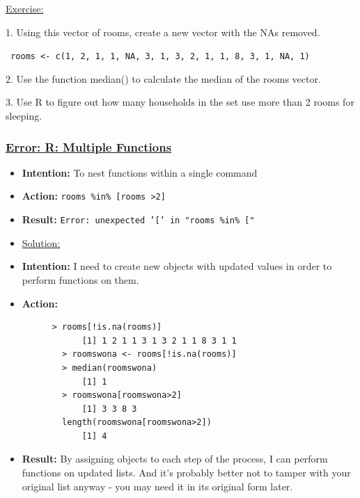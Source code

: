 \documentclass[12pt]{article}
\begin{document}
\vspace{0.5em}
\begin{addmargin}[1cm]{0cm}
\color{gray}
\underline{Exercise:}

1. Using this vector of rooms, create a new vector with the NAs removed.

\texttt{ rooms <- c(1, 2, 1, 1, NA, 3, 1, 3, 2, 1, 1, 8, 3, 1, NA, 1)}

2. Use the function median() to calculate the median of the rooms vector.

3. Use R to figure out how many households in the set use more than 2 rooms for sleeping.

\color{black}\vspace{0.5em}

{\subsubsection{\texorpdfstring{\underline{Error: R: Multiple Functions}}{}}\label{error:er19}
\begin{itemize}
  \vspace{-0.5em}\item \textbf{Intention:} To nest functions within a single command
  \vspace{-0.5em}\item \textbf{Action:} \texttt{rooms \%in\% [rooms >2]}
  \vspace{-0.5em}\item \textbf{Result:} \texttt{Error: unexpected '[' in "rooms \%in\% ["}
\end{itemize}
\begin{itemize}
\renewcommand{\labelitemi}{}
\item \underline{Solution:}
\renewcommand{\labelitemi}{$\bullet$}
  \item \textbf{Intention:} I need to create new objects with updated values in order to perform functions on them.
  \item \textbf{Action:} \vspace{-0.5em}\begin{verbatim}
      > rooms[!is.na(rooms)]
            [1] 1 2 1 1 3 1 3 2 1 1 8 3 1 1
        > roomswona <- rooms[!is.na(rooms)]
        > median(roomswona)
            [1] 1
        > roomswona[roomswona>2]
            [1] 3 3 8 3
        length(roomswona[roomswona>2])
            [1] 4
  \end{verbatim}
  \item \textbf{Result:} By assigning objects to each step of the process, I can perform functions on updated lists. And it's probably better not to tamper with your original list anyway - you may need it in its original form later.
\end{itemize}}

\end{addmargin}
\end{document}
